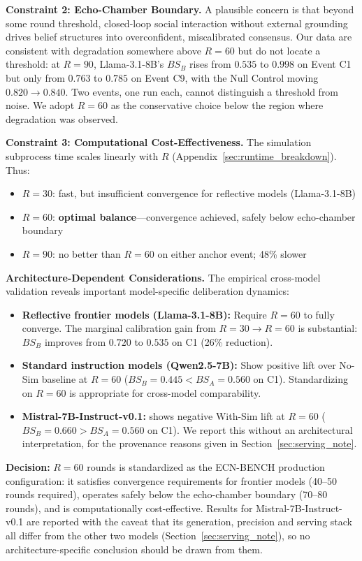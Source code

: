 \documentclass[11pt,journal,onecolumn]{IEEEtran}
\begin{document}
\textbf{Constraint 2: Echo-Chamber Boundary.}
A plausible concern is that beyond some round threshold, closed-loop social interaction without external grounding drives belief structures into overconfident, miscalibrated consensus. Our data are consistent with degradation somewhere above $R=60$ but do not locate a threshold: at $R=90$, Llama-3.1-8B's $BS_B$ rises from $0.535$ to $0.998$ on Event C1 but only from $0.763$ to $0.785$ on Event C9, with the Null Control moving $0.820 \to 0.840$. Two events, one run each, cannot distinguish a threshold from noise. We adopt $R=60$ as the conservative choice below the region where degradation was observed.

\textbf{Constraint 3: Computational Cost-Effectiveness.}
The simulation subprocess time scales linearly with $R$ (Appendix~\ref{sec:runtime_breakdown}). Thus:
\begin{itemize}
    \item $R=30$: fast, but insufficient convergence for reflective models (Llama-3.1-8B)
    \item $R=60$: \textbf{optimal balance}---convergence achieved, safely below echo-chamber boundary
    \item $R=90$: no better than $R=60$ on either anchor event; 48\% slower
\end{itemize}

\textbf{Architecture-Dependent Considerations.}
The empirical cross-model validation reveals important model-specific deliberation dynamics:
\begin{itemize}
    \item \textbf{Reflective frontier models (Llama-3.1-8B):} Require $R=60$ to fully converge. The marginal calibration gain from $R=30 \to R=60$ is substantial: $BS_B$ improves from $0.720$ to $0.535$ on C1 (26\% reduction).
    \item \textbf{Standard instruction models (Qwen2.5-7B):} Show positive lift over No-Sim baseline at $R=60$ ($BS_B = 0.445 < BS_A = 0.560$ on C1). Standardizing on $R=60$ is appropriate for cross-model comparability.
    \item \textbf{Mistral-7B-Instruct-v0.1:} shows negative With-Sim lift at $R=60$ ($BS_B = 0.660 > BS_A = 0.560$ on C1). We report this without an architectural interpretation, for the provenance reasons given in Section~\ref{sec:serving_note}.
\end{itemize}

\textbf{Decision:} $R=60$ rounds is standardized as the ECN-BENCH production configuration: it satisfies convergence requirements for frontier models (40--50 rounds required), operates safely below the echo-chamber boundary (70--80 rounds), and is computationally cost-effective. Results for Mistral-7B-Instruct-v0.1 are reported with the caveat that its generation, precision and serving stack all differ from the other two models (Section~\ref{sec:serving_note}), so no architecture-specific conclusion should be drawn from them.
\end{document}
